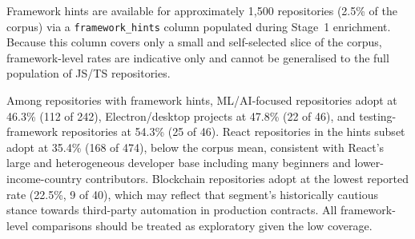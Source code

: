 Framework hints are available for approximately 1,500 repositories (2.5\% of the corpus) via a \texttt{framework\_hints} column populated during Stage~1 enrichment. Because this column covers only a small and self-selected slice of the corpus, framework-level rates are indicative only and cannot be generalised to the full population of JS/TS repositories.

Among repositories with framework hints, ML/AI-focused repositories adopt at 46.3\% (112 of 242), Electron/desktop projects at 47.8\% (22 of 46), and testing-framework repositories at 54.3\% (25 of 46). React repositories in the hints subset adopt at 35.4\% (168 of 474), below the corpus mean, consistent with React's large and heterogeneous developer base including many beginners and lower-income-country contributors. Blockchain repositories adopt at the lowest reported rate (22.5\%, 9 of 40), which may reflect that segment's historically cautious stance towards third-party automation in production contracts. All framework-level comparisons should be treated as exploratory given the low coverage.
